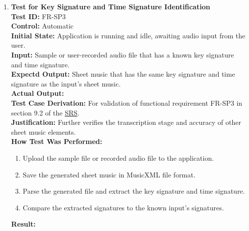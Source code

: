 \documentclass[12pt, titlepage]{article}
\begin{document}
\begin{enumerate}
    \item \textbf{Test for Key Signature and Time Signature Identification} \\
      \newline
      \textbf{Test ID:} FR-SP3 \\
      \textbf{Control:} Automatic \\
      \textbf{Initial State:} Application is running and idle, awaiting audio input from the user. \\
      \textbf{Input:} Sample or user-recorded audio file that has a known key signature and time signature. \\
      \textbf{Expectd Output:} Sheet music that has the same key signature and time signature as the input’s sheet music. \\
      \textbf{Actual Output:} \\
      \textbf{Test Case Derivation:} For validation of functional requirement FR-SP3 in section 9.2 of the 
      \href{https://github.com/emilyperica/ScoreGen/blob/main/docs/SRS-Volere/SRS.pdf}{SRS}. \\
      \textbf{Justification:} Further verifies the transcription stage and accuracy of other sheet music elements.\\
      \textbf{How Test Was Performed:}
      \begin{enumerate}
          \item Upload the sample file or recorded audio file to the application.
          \item Save the generated sheet music in MusicXML file format.
          \item Parse the generated file and extract the key signature and time signature.
          \item Compare the extracted signatures to the known input’s signatures.
      \end{enumerate}
      \textbf{Result:}


\end{enumerate}
\end{document}
